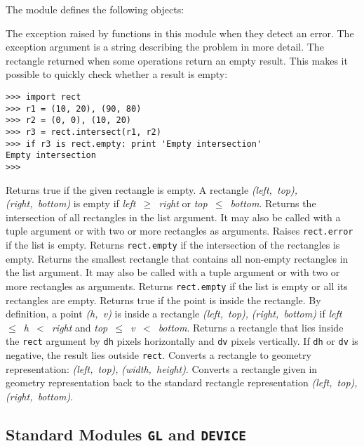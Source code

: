 The module defines the following objects:
\begin{description}
The exception raised by functions in this module when they detect an
error.
The exception argument is a string describing the problem in more
detail.
The rectangle returned when some operations return an empty result.
This makes it possible to quickly check whether a result is empty:
\bcode\begin{verbatim}
>>> import rect
>>> r1 = (10, 20), (90, 80)
>>> r2 = (0, 0), (10, 20)
>>> r3 = rect.intersect(r1, r2)
>>> if r3 is rect.empty: print 'Empty intersection'
Empty intersection
>>>
\end{verbatim}\ecode
{}
Returns true if the given rectangle is empty.
A rectangle
{\em (left,~top), (right,~bottom)}
is empty if
{\em left~$\geq$~right}
or
{\em top~$\leq$~bottom}.
Returns the intersection of all rectangles in the list argument.
It may also be called with a tuple argument or with two or more
rectangles as arguments.
Raises
{\tt rect.error}
if the list is empty.
Returns
{\tt rect.empty}
if the intersection of the rectangles is empty.
Returns the smallest rectangle that contains all non-empty rectangles in
the list argument.
It may also be called with a tuple argument or with two or more
rectangles as arguments.
Returns
{\tt rect.empty}
if the list is empty or all its rectangles are empty.
Returns true if the point is inside the rectangle.
By definition, a point
{\em (h,~v)}
is inside a rectangle
{\em (left,~top),}
{\em (right,~bottom)}
if
{\em left~$\leq$~h~$<$~right}
and
{\em top~$\leq$~v~$<$~bottom}.
Returns a rectangle that lies inside the
{\tt rect}
argument by
{\tt dh}
pixels horizontally
and
{\tt dv}
pixels
vertically.
If
{\tt dh}
or
{\tt dv}
is negative, the result lies outside
{\tt rect}.
Converts a rectangle to geometry representation:
{\em (left,~top),}
{\em (width,~height)}.
Converts a rectangle given in geometry representation back to the
standard rectangle representation
{\em (left,~top),}
{\em (right,~bottom)}.
\end{description}

\subsection{Standard Modules {\tt GL} and {\tt DEVICE}}

